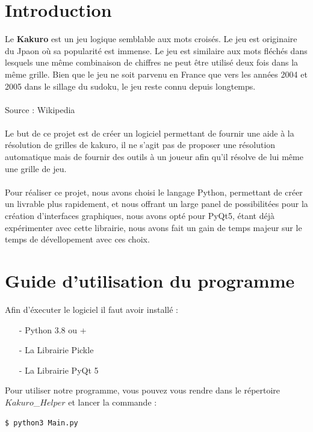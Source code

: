 \documentclass[french,12pt]{article}
\begin{document}
\thispagestyle{empty}
\setcounter{page}{0}
\newpage
\renewcommand{\contentsname}{Table des matières}
\tableofcontents
\newpage


\section{Introduction}
Le \textbf{Kakuro} est un jeu logique semblable aux mots croisés. Le jeu est originaire du Jpaon où sa popularité est immense. Le jeu est similaire aux mots fléchés dans lesquels une même combinaison de chiffres ne peut être utilisé deux fois dans la même grille. Bien que le jeu ne soit parvenu en France que vers les années 2004 et 2005 dans le sillage du sudoku, le jeu reste connu depuis longtemps. \\ \\ Source : Wikipedia \\ \\
Le but de ce projet est de créer un logiciel permettant de fournir une aide à la résolution de grilles de kakuro, il ne s'agit pas de proposer une résolution automatique mais de fournir des outils à un joueur afin qu'il résolve de lui même une grille de jeu. \\\ \\
Pour réaliser ce projet, nous avons choisi le langage Python, permettant de créer un livrable plus rapidement, et nous offrant un large panel de possibilitées pour la création d'interfaces graphiques, nous avons opté pour PyQt5, étant déjà expérimenter avec cette librairie, nous avons fait un gain de temps majeur sur le temps de dévellopement avec ces choix.
\section{Guide d'utilisation du programme}
Afin d'éxecuter le logiciel il faut avoir installé :
\begin{enumerate}
\item[-] Python 3.8 ou +
\item[-] La Librairie Pickle
\item[-] La Librairie PyQt 5
\end{enumerate} 
Pour utiliser notre programme, vous pouvez vous rendre dans le répertoire $Kakuro$\_$Helper$ et lancer la commande :
\begin{lstlisting}[language=bash]
  $ python3 Main.py
\end{lstlisting}


\newpage
\end{document}
